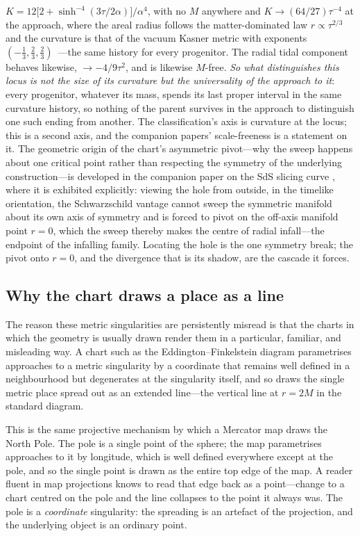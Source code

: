 \documentclass[11pt,a4paper]{article}
\theoremstyle{definition}
\begin{document}
$K=12\bigl[2+\sinh^{-4}(3\tau/2\alpha)\bigr]/\alpha^{4}$, with no $M$ anywhere and $K\to(64/27)\tau^{-4}$ at the approach, where the areal radius follows the matter-dominated law $r\propto\tau^{2/3}$ and the curvature is that of the vacuum Kasner metric with exponents $(-\tfrac13,\tfrac23,\tfrac23)$~\cite{Kasner1921}---the same history for every progenitor. The radial tidal component behaves likewise, $\to-4/9\tau^{2}$, and is likewise $M$-free. \emph{So what distinguishes this locus is not the size of its curvature but the universality of the approach to it}: every progenitor, whatever its mass, spends its last proper interval in the same curvature history, so nothing of the parent survives in the approach to distinguish one such ending from another. The classification's axis is curvature at the locus; this is a second axis, and the companion papers' scale-freeness is a statement on it. The geometric origin of the chart's asymmetric pivot---why the sweep happens about one critical point rather than respecting the symmetry of the underlying construction---is developed in the companion paper on the SdS slicing curve \cite{JanzenSlicing}, where it is exhibited explicitly: viewing the hole from outside, in the timelike orientation, the Schwarzschild vantage cannot sweep the symmetric manifold about its own axis of symmetry and is forced to pivot on the off-axis manifold point $r=0$, which the sweep thereby makes the centre of radial infall---the endpoint of the infalling family. Locating the hole is the one symmetry break; the pivot onto $r=0$, and the divergence that is its shadow, are the cascade it forces.

\subsection{Why the chart draws a place as a line}

The reason these metric singularities are persistently misread is that the charts in which the geometry is usually drawn render them in a particular, familiar, and misleading way. A chart such as the Eddington--Finkelstein diagram parametrises approaches to a metric singularity by a coordinate that remains well defined in a neighbourhood but degenerates at the singularity itself, and so draws the single metric place spread out as an extended line---the vertical line at $r=2M$ in the standard diagram.

This is the same projective mechanism by which a Mercator map draws the North Pole. The pole is a single point of the sphere; the map parametrises approaches to it by longitude, which is well defined everywhere except at the pole, and so the single point is drawn as the entire top edge of the map. A reader fluent in map projections knows to read that edge back as a point---change to a chart centred on the pole and the line collapses to the point it always was. The pole is a \emph{coordinate} singularity: the spreading is an artefact of the projection, and the underlying object is an ordinary point.
\end{document}
